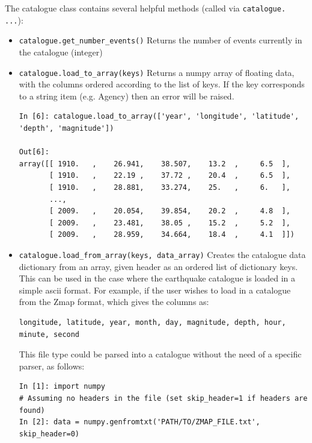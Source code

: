 The catalogue class contains several helpful methods (called via \verb=catalogue. ...=):
\begin{itemize}
\item \verb=catalogue.get_number_events()= Returns the number of events currently in the catalogue (integer)

\item \verb=catalogue.load_to_array(keys)= Returns a numpy array of floating data, with the columns ordered according to the list of keys. If the key corresponds to a string item (e.g. Agency) then an error will be raised.

\begin{Verbatim}[frame=single, commandchars=\\\{\}, fontsize=\scriptsize, samepage=true]
In [6]: catalogue.load_to_array(['year', 'longitude', 'latitude', 'depth', 'magnitude'])

Out[6]: 
array([[ 1910.   ,    26.941,    38.507,    13.2  ,     6.5  ],
       [ 1910.   ,    22.19 ,    37.72 ,    20.4  ,     6.5  ],
       [ 1910.   ,    28.881,    33.274,    25.   ,     6.   ],
       ..., 
       [ 2009.   ,    20.054,    39.854,    20.2  ,     4.8  ],
       [ 2009.   ,    23.481,    38.05 ,    15.2  ,     5.2  ],
       [ 2009.   ,    28.959,    34.664,    18.4  ,     4.1  ]]) 
\end{Verbatim}

\item \verb=catalogue.load_from_array(keys, data_array)= Creates the catalogue data dictionary from an array, given header as an ordered list of dictionary keys. This can be used in the case where the earthquake catalogue is loaded in a simple ascii format. For example, if the user wishes to load in a catalogue from the Zmap format, which gives the columns as:

\begin{verbatim}
longitude, latitude, year, month, day, magnitude, depth, hour, 
minute, second
\end{verbatim}

This file type could be parsed into a catalogue without the need of a specific parser, as follows:

\begin{Verbatim}[frame=single, commandchars=\\\{\}, fontsize=\scriptsize, samepage=true]
In [1]: import numpy
# Assuming no headers in the file (set skip_header=1 if headers are found)
In [2]: data = numpy.genfromtxt('PATH/TO/ZMAP_FILE.txt', skip_header=0)


\end{Verbatim}
\end{itemize}
